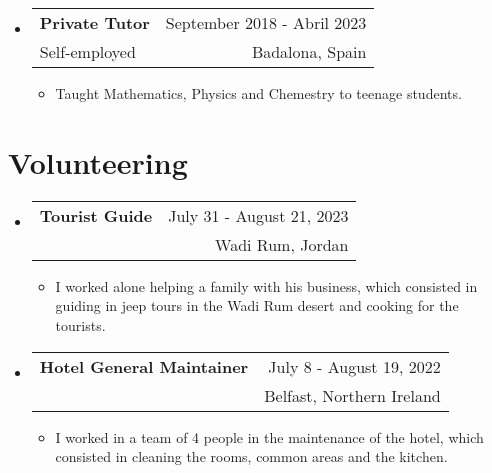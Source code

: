 \documentclass[a4paper,11pt]{article}
\makeatletter
\newcommand{\resumeQuadHeading}[4]{
  \item
  \begin{tabular*}{0.96\textwidth}[t]{l@{\extracolsep{\fill}}r}
    \textbf{#1} & \small #2 \\
    \small#3 & \small #4 \\
  \end{tabular*}
}
\newcommand{\resumeHeadingListStart}{
  \begin{itemize}[leftmargin=0.15in, label={}]
}
\newcommand{\resumeHeadingListEnd}{\end{itemize}}
\makeatother
\begin{document}
\resumeHeadingListStart{}
\resumeQuadHeading{Private Tutor}{September 2018 - Abril 2023}
{Self-employed}{Badalona, Spain}
\begin{itemize}[leftmargin=3em, itemsep=0.1em, topsep=2pt]
  \item \small Taught Mathematics, Physics and Chemestry to teenage students.
\end{itemize}
\resumeHeadingListEnd{}

\section{Volunteering}


\resumeHeadingListStart{}
\resumeQuadHeading{Tourist Guide}{July 31 - August 21, 2023}{}{Wadi Rum, Jordan}
\begin{itemize}[leftmargin=3em, itemsep=0.1em, topsep=2pt]
  \item \small I worked alone helping a family with his business, which consisted in guiding in jeep tours in the Wadi Rum desert and cooking for the tourists.
\end{itemize}
\resumeHeadingListEnd{}


\resumeHeadingListStart{}
\resumeQuadHeading{Hotel General Maintainer}{July 8 - August 19, 2022}{}{Belfast, Northern Ireland}
\begin{itemize}[leftmargin=3em, itemsep=0.1em, topsep=2pt]
  \item \small I worked in a team of 4 people in the maintenance of the hotel, which consisted in cleaning the rooms, common areas and the kitchen.
\end{itemize}
\resumeHeadingListEnd{}


\end{document}
